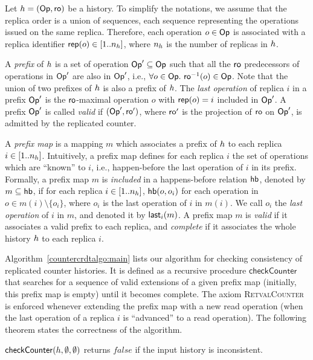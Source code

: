 Let ${h} = (\mathsf{Op}, \mathsf{ro})$ be a history.
To simplify the notations, we assume that the replica order is a union of sequences, each sequence representing the operations issued on the same replica.
Therefore, each operation $o\in \mathsf{Op}$ is associated with a replica identifier ${\sf rep}(o)\in [1..n_{h}]$, where $n_{h}$ is the number of replicas in ${h}$.

A \emph{prefix} of ${h}$ is a set of operation $\mathsf{Op}'\subseteq \mathsf{Op}$ such that all the $\mathsf{ro}$ predecessors of operations in $\mathsf{Op}'$ are also in $\mathsf{Op}'$, i.e., $\forall {o}\in \mathsf{Op}.\ \mathsf{ro}^{-1}({o})\in \mathsf{Op}$. Note that the union of two prefixes of ${h}$ is also a prefix of ${h}$. The \emph{last operation} of replica $i$ in a prefix $\mathsf{Op}'$ is the $\mathsf{ro}$-maximal operation $o$ with ${\sf rep}(o)=i$ included in $\mathsf{Op}'$.
A prefix $\mathsf{Op}'$ is called \emph{valid} if $(\mathsf{Op}',\mathsf{ro}')$, where $\mathsf{ro}'$ is the projection of $\mathsf{ro}$ on $\mathsf{Op}'$, is admitted by the replicated counter.

A \emph{prefix map} is a mapping $m$ which associates a prefix of ${h}$ to each replica $i\in [1..n_{h}]$.
Intuitively, a prefix map defines for each replica $i$ the set of operations which are ``known'' to $i$, i.e., happen-before the last operation of $i$ in its prefix. Formally, a prefix map $m$ is \emph{included} in a happens-before relation $\textsf{hb}$, denoted by $m\subseteq \textsf{hb}$, if for each replica $i\in [1..n_{h}]$, $\textsf{hb}(o,o_i)$ for each operation in $o\in m(i)\setminus\{o_i\}$, where $o_i$ is the last operation of $i$ in $m(i)$. We call $o_i$ the \emph{last operation} of $i$ in $m$, and denoted it by ${\sf last}_i(m)$.
A prefix map $m$ is \emph{valid} if it associates a valid prefix to each replica, and \emph{complete} if it associates the whole history ${h}$ to each replica $i$.

Algorithm~\ref{countercrdtalgo:main} lists our algorithm for checking consistency of replicated counter histories. It is defined as a recursive procedure $\mathsf{checkCounter}$ that searches for a sequence of valid extensions of a given prefix map (initially, this prefix map is empty) until it becomes complete. The axiom \textsc{RetvalCounter} is enforced whenever extending the prefix map with a new {\sf read} operation (when the last operation of a replica $i$ is ``advanced'' to a {\sf read} operation). The following theorem states the correctness of the algorithm.

\begin{theorem}

$\mathsf{checkCounter}({h},\emptyset,\emptyset)$ returns $\mathit{false}$ if the input history is inconsistent.

\end{theorem}

